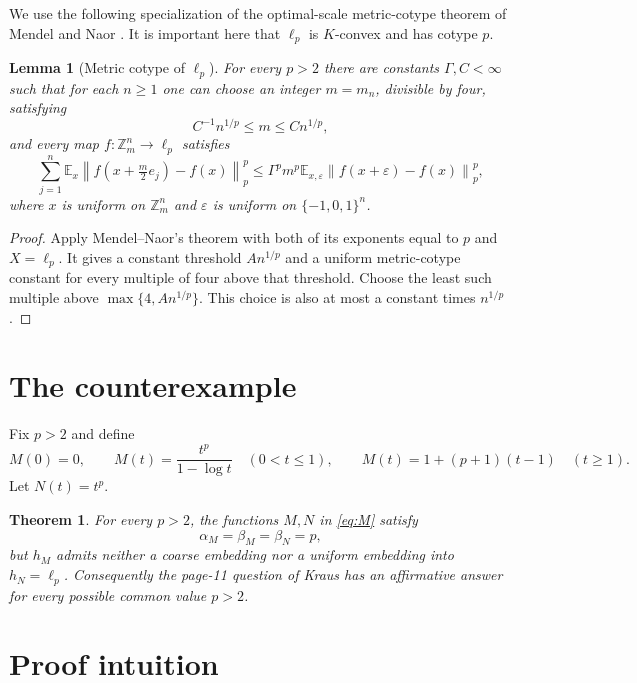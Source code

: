 \documentclass[11pt]{article}
\newtheorem{theorem}{Theorem}
\newtheorem{lemma}{Lemma}
\newcommand{\Z}{\mathbb{Z}}
\newcommand{\E}{\mathbb{E}}
\newcommand{\norm}[1]{\left\lVert #1\right\rVert}
\begin{document}
We use the following specialization of the optimal-scale metric-cotype
theorem of Mendel and Naor \cite[Theorem 4.1]{MN}.  It is important here that
$\ell_p$ is $K$-convex and has cotype $p$.

\begin{lemma}[Metric cotype of $\ell_p$]\label{lem:mc}
For every $p>2$ there are constants $\Gamma,C<\infty$ such that for each
$n\ge1$ one can choose an integer $m=m_n$, divisible by four, satisfying
\[
 C^{-1}n^{1/p}\le m\le Cn^{1/p},
\]
and every map $f:\Z_m^n\to\ell_p$ satisfies
\begin{equation}\label{eq:mc}
 \sum_{j=1}^n \E_x
 \norm{f(x+\tfrac m2e_j)-f(x)}_p^p
 \le
 \Gamma^p m^p\E_{x,\varepsilon}
 \norm{f(x+\varepsilon)-f(x)}_p^p,
\end{equation}
where $x$ is uniform on $\Z_m^n$ and
$\varepsilon$ is uniform on $\{-1,0,1\}^n$.
\end{lemma}

\begin{proof}
Apply Mendel--Naor's theorem with both of its exponents equal to $p$ and
$X=\ell_p$.  It gives a constant threshold $A n^{1/p}$ and a uniform
metric-cotype constant for every multiple of four above that threshold.
Choose the least such multiple above $\max\{4,A n^{1/p}\}$.  This choice is
also at most a constant times $n^{1/p}$.
\end{proof}

\section{The counterexample}

Fix $p>2$ and define
\begin{equation}\label{eq:M}
 M(0)=0,\qquad
 M(t)=\frac{t^p}{1-\log t}\quad(0<t\le1),\qquad
 M(t)=1+(p+1)(t-1)\quad(t\ge1).
\end{equation}
Let $N(t)=t^p$.

\begin{theorem}\label{thm:main}
For every $p>2$, the functions $M,N$ in \eqref{eq:M} satisfy
\[
       \alpha_M=\beta_M=\beta_N=p,
\]
but $h_M$ admits neither a coarse embedding nor a uniform embedding into
$h_N=\ell_p$.  Consequently the page-11 question of Kraus has an affirmative
answer for every possible common value $p>2$.
\end{theorem}

\section{Proof intuition}
\end{document}

